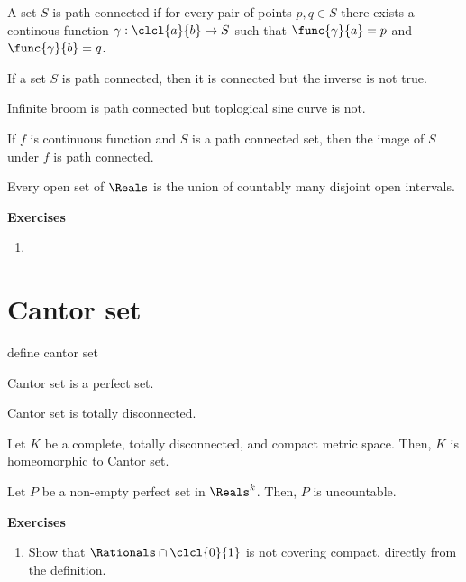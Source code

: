 \begin{definition}
    A set \(S\) is path connected if for every pair of points \(p,q \in S\) there exists a continous function \(\gamma: \clcl{a}{b} \to S\) such that \(\func{\gamma}{a} = p\) and \(\func{\gamma}{b} = q\).
\end{definition}
\begin{theorem}
    If a set \(S\) is path connected, then it is connected but the inverse is not true.
\end{theorem}
\begin{example}
    Infinite broom is path connected but toplogical sine curve is not.
\end{example}
\begin{proposition}
    If \(f\) is continuous function and \(S\) is a path connected set, then the image of \(S\) under \(f\) is path connected.
\end{proposition}
\begin{proposition}
    Every open set of \(\Reals\) is the union of countably many disjoint open intervals.
\end{proposition}
{\Large\textbf{Exercises}}
\begin{enumerate}
    \item
\end{enumerate}


\newpage


\section{Cantor set}
\begin{definition}
    define cantor set
\end{definition}

\begin{proposition}
    Cantor set is a perfect set.
\end{proposition}

\begin{proposition}
    Cantor set is totally disconnected.
\end{proposition}
\begin{theorem}
    Let \(K\) be a complete, totally disconnected, and compact metric space. Then, \(K\) is homeomorphic to Cantor set.
\end{theorem}

\begin{theorem}
    Let \(P\) be a non-empty perfect set in \(\Reals^k\). Then, \(P\) is uncountable.
\end{theorem}

{\Large\textbf{Exercises}}
\begin{enumerate}
    \item Show that \(\Rationals \cap \clcl{0}{1}\) is not covering compact, directly from the definition.
\end{enumerate}